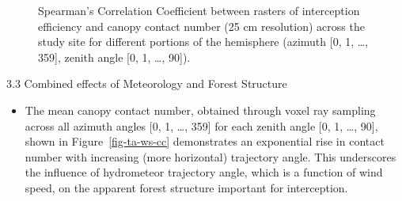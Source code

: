 \documentclass[
  letterpaper,
  DIV=11,
  numbers=noendperiod]{scrartcl}
\providecommand{\tightlist}{%
  \setlength{\itemsep}{0pt}\setlength{\parskip}{0pt}}\usepackage{longtable,booktabs,array}
\begin{document}
\begin{figure}

\begin{minipage}{0.50\linewidth}


\subcaption{\label{fig-hemi-cc-ip-pwle}}

\end{minipage}%
%
\begin{minipage}{0.50\linewidth}


\subcaption{\label{fig-hemi-cc-ip-fsrs}}

\end{minipage}%

\caption{\label{fig-hemi-ip-cc}Spearman's Correlation Coefficient
between rasters of interception efficiency and canopy contact number (25
cm resolution) across the study site for different portions of the
hemisphere (azimuth {[}0, 1, \ldots, 359{]}, zenith angle {[}0, 1,
\ldots, 90{]}).}

\end{figure}%

3.3 Combined effects of Meteorology and Forest Structure

\begin{itemize}
\tightlist
\item
  The mean canopy contact number, obtained through voxel ray sampling
  across all azimuth angles {[}0, 1, \ldots, 359{]} for each zenith
  angle {[}0, 1, \ldots, 90{]}, shown in Figure~\ref{fig-ta-ws-cc}
  demonstrates an exponential rise in contact number with increasing
  (more horizontal) trajectory angle. This underscores the influence of
  hydrometeor trajectory angle, which is a function of wind speed, on
  the apparent forest structure important for interception.
\end{itemize}
\end{document}
